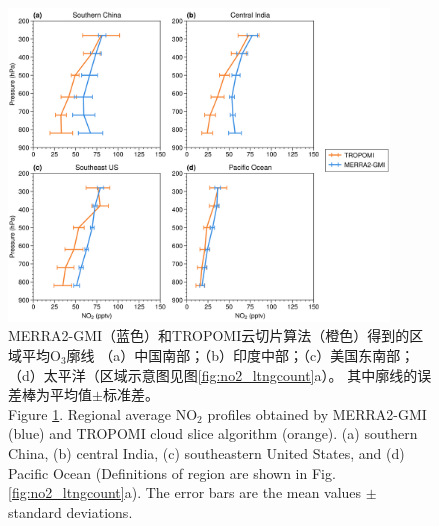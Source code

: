 \begin{figure}[H]
    \centering
    \includegraphics[width=0.9\textwidth]{./figures/uto3_profile.png}
    \caption{
    MERRA2-GMI（蓝色）和TROPOMI云切片算法（橙色）得到的区域平均O$_3$廓线
    （a）中国南部；（b）印度中部；（c）美国东南部；（d）太平洋（区域示意图见图\ref{fig:no2_ltngcount}a）。
    其中廓线的误差棒为平均值$\pm$标准差。\\
    Figure \ref{fig:uto3_profile}. Regional average NO$_2$ profiles obtained by MERRA2-GMI (blue) and TROPOMI cloud slice algorithm (orange).
    (a) southern China, (b) central India, (c) southeastern United States, and (d) Pacific Ocean
    (Definitions of region are shown in Fig. \ref{fig:no2_ltngcount}a).
    The error bars are the mean values $\pm$ standard deviations.
    }
    \label{fig:uto3_profile}
\end{figure}

